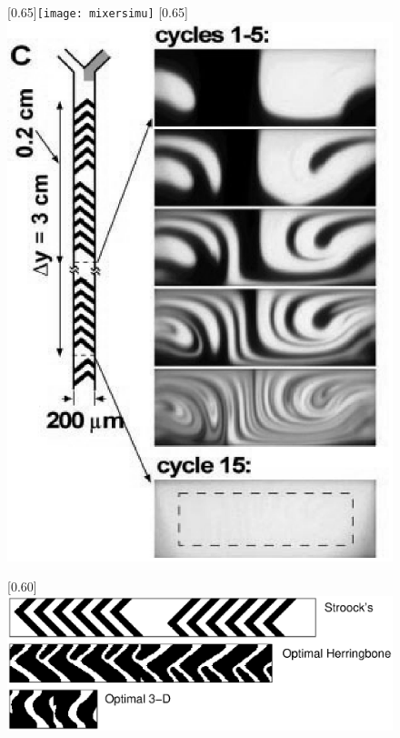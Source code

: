 \documentclass[dvips,landscape]{foils}
\begin{document}
\newpage
  \begin{figure}
    \centerline{
       \scalebox{0.65}[0.65]{\texttt{[image: mixersimu]}}
       \scalebox{0.65}[0.65]{\includegraphics{stroockcrosssection0}}
    }
  \end{figure}
\vspace{-0.5cm}
\begin{figure}  
       \scalebox{0.60}[0.60]{\includegraphics[trim=-2cm 0cm 0cm 0cm,clip]{example2fullcycle}}
\end{figure}  
\end{document}
